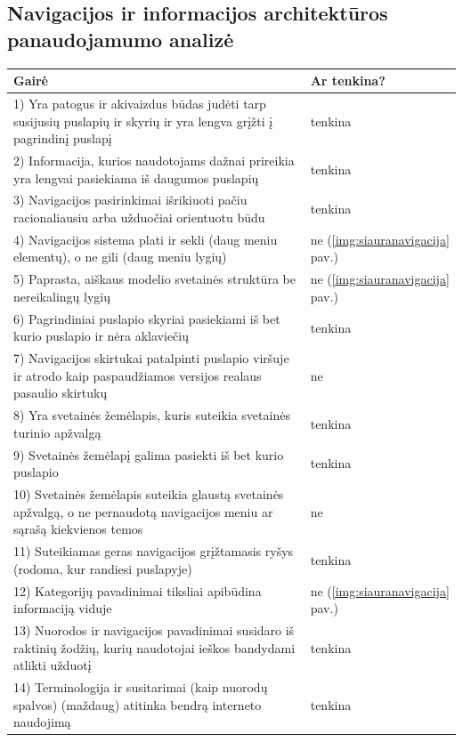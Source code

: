 \documentclass{VUMIFPSkursinis}
\begin{document}
\subsection{Navigacijos ir informacijos architektūros panaudojamumo analizė}
\begin{center}
\begin{longtable}{ |p{}|p{2cm}| } 
 \hline
	Gairė & Ar tenkina? \\ \hline
	1) Yra patogus ir akivaizdus būdas judėti tarp susijusių puslapių ir skyrių ir yra lengva grįžti į pagrindinį puslapį & tenkina \\ \hline
	2) Informacija, kurios naudotojams dažnai prireikia yra lengvai pasiekiama iš daugumos puslapių & tenkina \\ \hline
	3) Navigacijos pasirinkimai išrikiuoti pačiu racionaliausiu arba užduočiai orientuotu būdu & tenkina \\ \hline
	4) Navigacijos sistema plati ir sekli (daug meniu elementų), o ne gili (daug meniu lygių)  & ne (\ref{img:siauranavigacija} pav.) \\ \hline
	5) Paprasta, aiškaus modelio svetainės struktūra be nereikalingų lygių & ne (\ref{img:siauranavigacija} pav.) \\ \hline
	6) Pagrindiniai puslapio skyriai pasiekiami iš bet kurio puslapio ir nėra aklaviečių & tenkina \\ \hline
	7) Navigacijos skirtukai patalpinti puslapio viršuje ir atrodo kaip paspaudžiamos versijos realaus pasaulio skirtukų & ne \\ \hline
	8) Yra svetainės žemėlapis, kuris suteikia svetainės turinio apžvalgą & tenkina \\ \hline
	9) Svetainės žemėlapį galima pasiekti iš bet kurio puslapio & tenkina \\ \hline
	10) Svetainės žemėlapis suteikia glaustą svetainės apžvalgą, o ne pernaudotą navigacijos meniu ar sąrašą kiekvienos temos & ne \\ \hline
	11) Suteikiamas geras navigacijos grįžtamasis ryšys (rodoma, kur randiesi puslapyje) & tenkina \\ \hline
	12) Kategorijų pavadinimai tiksliai apibūdina informaciją viduje & ne (\ref{img:siauranavigacija} pav.) \\ \hline
	13) Nuorodos ir navigacijos pavadinimai susidaro iš raktinių žodžių, kurių naudotojai ieškos bandydami atlikti užduotį & tenkina \\ \hline
	14) Terminologija ir susitarimai (kaip nuorodų spalvos) (maždaug) atitinka bendrą interneto naudojimą & tenkina \\ \hline

\end{longtable}
\end{center}
\end{document}
